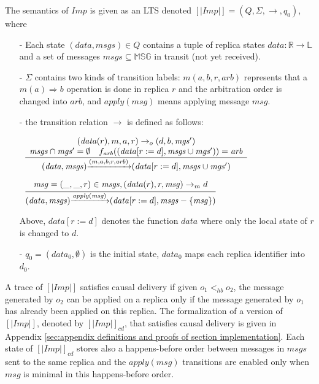 The semantics of $\mathit{Imp}$ is given as an LTS denoted $[|\mathit{Imp}|] = (Q,\Sigma,\rightarrow,q_0)$, where

\begin{itemize}
\setlength{\itemsep}{0.5pt}
\item[-] Each state $(\mathit{data},\mathit{msgs}) \in Q$ contains a tuple of replica states $\mathit{data}: \mathbb{R} \rightarrow \mathbb{L}$ and a set of messages $\mathit{msgs} \subseteq \mathbb{MSG}$ in transit (not yet received).

\item[-] $\Sigma$ contains two kinds of transition labels: $m(a,b,r,\mathit{arb})$ represents that a $m(a) \Rightarrow b$ operation is done in replica $r$ and the arbitration order is changed into $\mathit{arb}$, and $\mathit{apply}(\mathit{msg})$ means applying message $\mathit{msg}$.

\item[-] the transition relation $\rightarrow$ is defined as follows:
  \begin{center}
$\begin{array}{l c}
   \bigfrac{ 
   \begin{array}{c}
     (\mathit{data}(r),m,a,r) \rightarrow_o (d,b,\mathit{mgs}')\\ 
     \mathit{msgs} \cap \mathit{mgs}' = \emptyset\quad f_{\mathit{arb}}((\mathit{data}[r:= d], \mathit{msgs} \cup \mathit{mgs}')) = \mathit{arb}
   \end{array}}
     {(\mathit{data},\mathit{msgs}) {\xrightarrow{(m,a,b,r,\mathit{arb})}} (\mathit{data}[r:=d], \mathit{msgs} \cup \mathit{mgs}')}
 \end{array}$

\medskip
    $\begin{array}{l c} \bigfrac{ \mathit{msg} = (\_,\_,r) \in \mathit{msgs},(\mathit{data}(r),r,\mathit{msg}) \rightarrow_m d } {(\mathit{data},\mathit{msgs}) {\xrightarrow{\mathit{apply}(\mathit{msg})}} (\mathit{data}[r:=d],\mathit{msgs} - \{ \mathit{msg} \})} \end{array}$    
  \end{center}
\medskip
Above, $\mathit{data}[r:=d]$ denotes the function $\mathit{data}$ where only the local state of $r$ is changed to $d$.
\item[-] $q_0 = (data_0,\emptyset)$ is the initial state, $data_0$ maps each replica identifier into $d_0$.
\end{itemize}

A trace of $[|\mathit{Imp}|]$ satisfies causal delivery if given $o_1 <_{\mathit{hb}} o_2$, the message generated by $o_2$ can be applied on a replica only if the message generated by $o_1$ has already been applied on this replica. The formalization of a version of $[|\mathit{Imp}|]$, denoted by $[|\mathit{Imp}|]_{cd}$, that satisfies causal delivery is given in Appendix \ref{sec:appendix definitions and proofs of section implementation}. Each state of $[|\mathit{Imp}|]_{cd}$ stores also a happens-before order between messages in $\mathit{msgs}$ sent to the same replica and the $\mathit{apply}(\mathit{msg})$ transitions are enabled only when $\mathit{msg}$ is minimal in this happens-before order.



